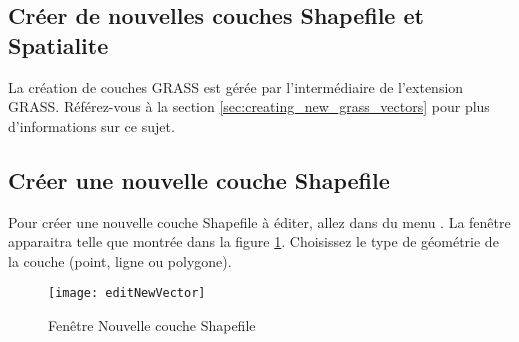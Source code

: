 \subsection{Créer de nouvelles couches Shapefile et Spatialite}\label{sec:create shape}

La création de couches GRASS est gérée par l'intermédiaire de l'extension GRASS. Référez-vous à la section \ref{sec:creating_new_grass_vectors} pour plus d'informations sur ce sujet.

\subsection{Créer une nouvelle couche Shapefile}\label{sec:create shape}

Pour créer une nouvelle couche Shapefile à éditer, allez dans  du menu . La fenêtre  apparaitra telle que montrée dans la figure \ref{fig:newvectorlayer}. Choisissez le type de géométrie de la couche (point, ligne ou polygone).

\begin{figure}[ht]
  \begin{center}
  \texttt{[image: editNewVector]}
  \caption{Fenêtre Nouvelle couche Shapefile \nixcaption}\label{fig:newvectorlayer}
\end{center}
\end{figure}

